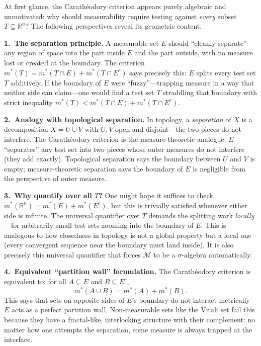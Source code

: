 \documentclass[11pt]{report}
\begin{document}
\begin{rembox}
At first glance, the Carath\'eodory criterion appears purely algebraic and unmotivated: why should measurability require testing against \textit{every} subset $T \subseteq \mathbb{R}^n$? The following perspectives reveal its geometric content.

\textbf{1.\ The separation principle.} A measurable set $E$ should ``cleanly separate'' any region of space into the part inside $E$ and the part outside, with no measure lost or created at the boundary. The criterion $m^*(T) = m^*(T \cap E) + m^*(T \cap E^c)$ says precisely this: $E$ splits every test set $T$ additively. If the boundary of $E$ were ``fuzzy''---trapping measure in a way that neither side can claim---one would find a test set $T$ straddling that boundary with strict inequality $m^*(T) < m^*(T \cap E) + m^*(T \cap E^c)$.

\textbf{2.\ Analogy with topological separation.} In topology, a \textit{separation} of $X$ is a decomposition $X = U \cup V$ with $U, V$ open and disjoint---the two pieces do not interfere. The Carath\'eodory criterion is the measure-theoretic analogue: $E$ ``separates'' any test set into two pieces whose outer measures do not interfere (they add exactly). Topological separation says the boundary between $U$ and $V$ is empty; measure-theoretic separation says the boundary of $E$ is negligible from the perspective of outer measure.

\textbf{3.\ Why quantify over all $T$?} One might hope it suffices to check $m^*(\mathbb{R}^n) = m^*(E) + m^*(E^c)$, but this is trivially satisfied whenever either side is infinite. The universal quantifier over $T$ demands the splitting work \textit{locally}---for arbitrarily small test sets zooming into the boundary of $E$. This is analogous to how closedness in topology is not a global property but a local one (every convergent sequence near the boundary must land inside). It is also precisely this universal quantifier that forces $\mathcal{M}$ to be a $\sigma$-algebra automatically.

\textbf{4.\ Equivalent ``partition wall'' formulation.} The Carath\'eodory criterion is equivalent to: for all $A \subseteq E$ and $B \subseteq E^c$,
\[
m^*(A \cup B) = m^*(A) + m^*(B).
\]
This says that sets on opposite sides of $E$'s boundary do not interact metrically---$E$ acts as a perfect partition wall. Non-measurable sets like the Vitali set fail this because they have a fractal-like, interlocking structure with their complement: no matter how one attempts the separation, some measure is always trapped at the interface.
\end{rembox}
\end{document}
